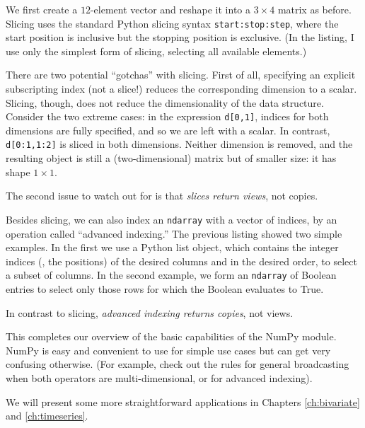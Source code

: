 We first create a $12$-element vector and reshape it into a $3 \times
4$ matrix as before. Slicing uses the standard Python slicing syntax
\texttt{start:stop:step}, where the start position is inclusive but
the stopping position is exclusive. (In the listing, I use only the
simplest form of slicing, selecting all available elements.)

There are two potential ``gotchas'' with slicing. First of all,
specifying an explicit subscripting index (not a slice!) reduces the
corresponding dimension to a scalar.  Slicing, though, does not reduce
the dimensionality of the data structure. Consider the two extreme
cases: in the expression \texttt{d[0,1]}, indices for both dimensions
are fully specified, and so we are left with a scalar. In contrast,
\texttt{d[0:1,1:2]} is sliced in both dimensions. Neither dimension is
removed, and the resulting object is still a (two-dimensional) matrix
but of smaller size: it has shape $1 \times 1$.

The second issue to watch out for is that \emph{slices return views},
not copies.

Besides slicing, we can also index an \texttt{ndarray} with a vector
of indices, by an operation called ``advanced indexing.'' The previous
listing showed two simple examples. In the first we use a Python list
object, which contains the integer indices (\ie, the positions) of the
desired columns and in the desired order, to select a subset of
columns. In the second example, we form an \texttt{ndarray} of Boolean
entries to select only those rows for which the Boolean evaluates to
True.

In contrast to slicing, \emph{advanced indexing returns copies}, not
views.


This completes our overview of the basic capabilities of the NumPy
module. NumPy is easy and convenient to use for simple use cases but
can get very confusing otherwise. (For example, check out the rules for
general broadcasting when both operators are multi-dimensional, or for
advanced indexing).

We will present some more straightforward applications in Chapters
\ref{ch:bivariate} and \ref{ch:timeseries}.
      
